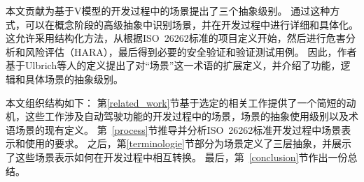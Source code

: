 本文贡献为基于V模型的开发过程中的场景提出了三个抽象级别。
通过这种方式，可以在概念阶段的高级抽象中识别场景，并在开发过程中进行详细和具体化。
这允许采用结构化方法，从根据ISO~26262标准的项目定义开始，然后进行危害分析和风险评估（HARA），最后得到必要的安全验证和验证测试用例。
因此，作者基于Ulbrich等人\cite{ulbrich_definition_2015}的定义提出了对“场景”这一术语的扩展定义，并介绍了功能，逻辑和具体场景的抽象级别。

本文组织结构如下：
第\ref {related_work}节基于选定的相关工作提供了一个简短的动机，这些工作涉及自动驾驶功能的开发过程中的场景，场景的抽象使用级别以及术语场景的现有定义。
第~\ref{process}节推导并分析ISO~26262标准开发过程中场景表示和使用的要求。
之后，第\ref{terminologie}节部分为场景定义了三层抽象，并展示了这些场景表示如何在开发过程中相互转换。
最后，第~\ref{conclusion}节作出一份总结。